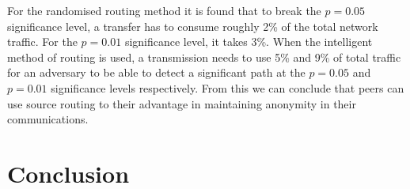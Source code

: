 \documentclass[ %
                    author={Luke Murray},
                supervisor={Dr. Simon Hollis},
                     title={Shadow Peer-to-Peer Networks},
                  subtitle={},
                    degree={MEng},
                      year={2013} ]{thesis}
\begin{document}
For the randomised routing method it is found that to break the $p = 0.05$ significance level, a transfer has to consume roughly 2\% of the total network traffic. For the $p = 0.01$ significance level, it takes 3\%. When the intelligent method of routing is used, a transmission needs to use 5\% and 9\% of total traffic for an adversary to be able to detect a significant path at the $p = 0.05$ and $p = 0.01$ significance levels respectively. From this we can conclude that peers can use source routing to their advantage in maintaining anonymity in their communications.


\chapter{Conclusion}
\label{chap:conclusion}

\end{document}

